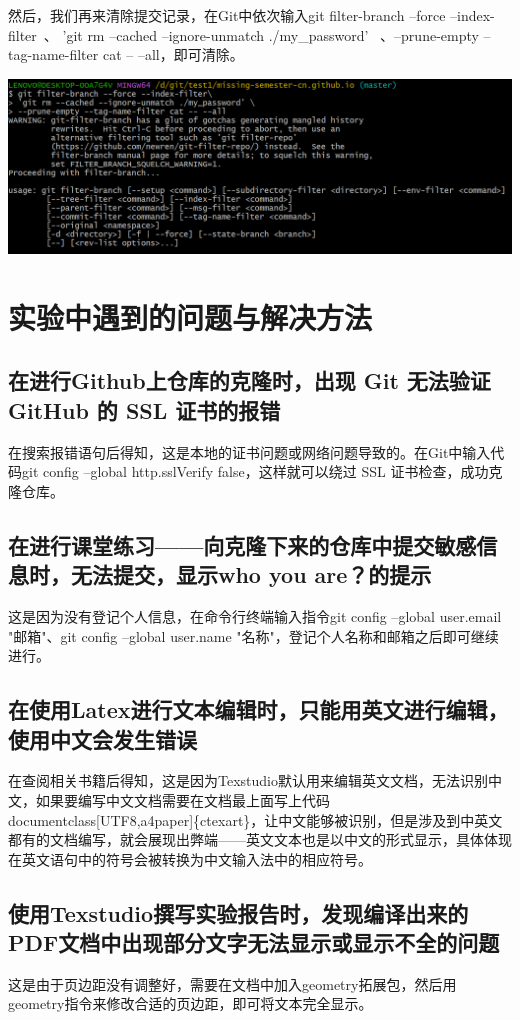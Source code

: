 \documentclass[UTF8,a4paper]{ctexart}
\begin{document}
\begin{sloppypar}
	然后，我们再来清除提交记录，在Git中依次输入git filter-branch --force --index-filter\ 、 'git rm --cached --ignore-unmatch ./my\_password' \ 、--prune-empty --tag-name-filter cat -- --all，即可清除。
	
	\includegraphics[width = 16cm]{9}
	
	\section{实验中遇到的问题与解决方法}
	\subsection{在进行Github上仓库的克隆时，出现 Git 无法验证 GitHub 的 SSL 证书的报错}
	在搜索报错语句后得知，这是本地的证书问题或网络问题导致的。在Git中输入代码git config --global http.sslVerify false，这样就可以绕过 SSL 证书检查，成功克隆仓库。
	\subsection{在进行课堂练习——向克隆下来的仓库中提交敏感信息时，无法提交，显示who you are？的提示}
	这是因为没有登记个人信息，在命令行终端输入指令git config --global user.email "邮箱"、git config --global user.name "名称"，登记个人名称和邮箱之后即可继续进行。
	\subsection{在使用Latex进行文本编辑时，只能用英文进行编辑，使用中文会发生错误}
	在查阅相关书籍后得知，这是因为Texstudio默认用来编辑英文文档，无法识别中文，如果要编写中文文档需要在文档最上面写上代码documentclass[UTF8,a4paper]\{ctexart\}，让中文能够被识别，但是涉及到中英文都有的文档编写，就会展现出弊端——英文文本也是以中文的形式显示，具体体现在英文语句中的符号会被转换为中文输入法中的相应符号。
	\subsection{使用Texstudio撰写实验报告时，发现编译出来的PDF文档中出现部分文字无法显示或显示不全的问题}
	这是由于页边距没有调整好，需要在文档中加入geometry拓展包，然后用geometry指令来修改合适的页边距，即可将文本完全显示。

\end{sloppypar}
\end{document}
